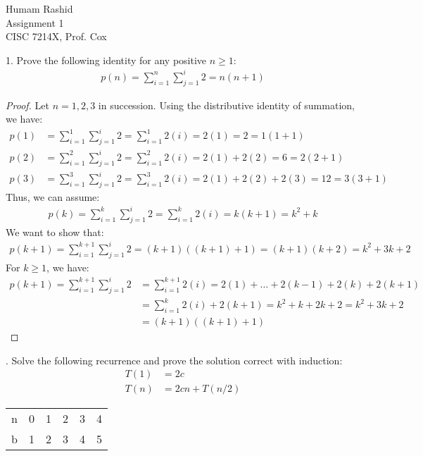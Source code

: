\documentclass{scrartcl}
\begin{document}
\begin{flushleft}

    Humam Rashid\\
    Assignment 1\\
    CISC 7214X, Prof. Cox\\
    \bigskip
    
    1. Prove the following identity for any positive $n \geq 1$:
    \begin{align*}
        p(n) = \sum_{i=1}^{n}\sum_{j=1}^{i} 2 = n (n + 1)
    \end{align*}
    \begin{proof}
        Let $n = 1,2,3$ in succession. Using the distributive identity of summation, we have:
        \begin{align*}
            p(1) &= \sum_{i=1}^{1}\sum_{j=1}^{i} 2 = \sum_{i=1}^{1} 2(i) = 2(1) = 2 = 1(1 + 1)\\
            p(2) &= \sum_{i=1}^{2}\sum_{j=1}^{i} 2 = \sum_{i=1}^{2} 2(i) = 2(1) + 2(2) = 6
            = 2(2 + 1)\\
            p(3) &= \sum_{i=1}^{3}\sum_{j=1}^{i} 2 = \sum_{i=1}^{3} 2(i) = 2(1) + 2(2) + 2(3) = 12
            = 3(3 + 1)
        \end{align*}
        Thus, we can assume:
        \begin{align*}
            p(k) = \sum_{i=1}^{k}\sum_{j=1}^{i} 2 = \sum_{i=1}^{k} 2(i) = k(k + 1) = k^2 + k
        \end{align*}
        We want to show that:
        \begin{align*}
            p(k + 1) = \sum_{i=1}^{k + 1}\sum_{j=1}^{i} 2 = (k + 1) ((k + 1) + 1) = (k + 1) (k + 2) = k^2 + 3k + 2
        \end{align*}
        For $k \geq 1$, we have:
        \begin{align*}
            p(k + 1) = \sum_{i=1}^{k + 1}\sum_{j=1}^{i} 2 &= \sum_{i=1}^{k+1} 2(i) = 2(1) + \ldots
            + 2(k - 1) + 2(k) + 2(k + 1) \\
            &= \sum_{i=1}^{k} 2(i) + 2(k + 1) = k^2 + k + 2k + 2 = k^2 + 3k + 2 \\
            &= (k + 1) ((k + 1) + 1)
        \end{align*}
    \end{proof}
    . Solve the following recurrence and prove the solution correct with induction:
    \begin{align*}
        T(1) &= 2c\\
        T(n) &= 2cn + T(n/2)
    \end{align*}
    \begin{center}
        \begin{tabular}{|c| c c c c c|}
            \hline
            n & 0 & 1 & 2 & 3 & 4 \\
            b & 1 & 2 & 3 & 4 & 5 \\
            \hline
        \end{tabular}
    \end{center}

\end{flushleft}
\end{document}
